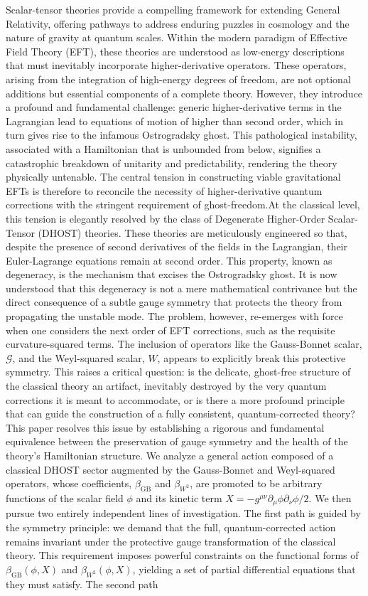 \documentclass[twocolumn]{aastex631}
\begin{document}
Scalar-tensor theories provide a compelling framework for extending General Relativity, offering pathways to address enduring puzzles in cosmology and the nature of gravity at quantum scales. Within the modern paradigm of Effective Field Theory (EFT), these theories are understood as low-energy descriptions that must inevitably incorporate higher-derivative operators. These operators, arising from the integration of high-energy degrees of freedom, are not optional additions but essential components of a complete theory. However, they introduce a profound and fundamental challenge: generic higher-derivative terms in the Lagrangian lead to equations of motion of higher than second order, which in turn gives rise to the infamous Ostrogradsky ghost. This pathological instability, associated with a Hamiltonian that is unbounded from below, signifies a catastrophic breakdown of unitarity and predictability, rendering the theory physically untenable. The central tension in constructing viable gravitational EFTs is therefore to reconcile the necessity of higher-derivative quantum corrections with the stringent requirement of ghost-freedom.At the classical level, this tension is elegantly resolved by the class of Degenerate Higher-Order Scalar-Tensor (DHOST) theories. These theories are meticulously engineered so that, despite the presence of second derivatives of the fields in the Lagrangian, their Euler-Lagrange equations remain at second order. This property, known as degeneracy, is the mechanism that excises the Ostrogradsky ghost. It is now understood that this degeneracy is not a mere mathematical contrivance but the direct consequence of a subtle gauge symmetry that protects the theory from propagating the unstable mode. The problem, however, re-emerges with force when one considers the next order of EFT corrections, such as the requisite curvature-squared terms. The inclusion of operators like the Gauss-Bonnet scalar, $\mathcal{G}$, and the Weyl-squared scalar, $W$, appears to explicitly break this protective symmetry. This raises a critical question: is the delicate, ghost-free structure of the classical theory an artifact, inevitably destroyed by the very quantum corrections it is meant to accommodate, or is there a more profound principle that can guide the construction of a fully consistent, quantum-corrected theory?This paper resolves this issue by establishing a rigorous and fundamental equivalence between the preservation of gauge symmetry and the health of the theory's Hamiltonian structure. We analyze a general action composed of a classical DHOST sector augmented by the Gauss-Bonnet and Weyl-squared operators, whose coefficients, $\beta_{\text{GB}}$ and $\beta_{W^2}$, are promoted to be arbitrary functions of the scalar field $\phi$ and its kinetic term $X = -g^{\mu\nu}\partial_\mu\phi\partial_\nu\phi/2$. We then pursue two entirely independent lines of investigation. The first path is guided by the symmetry principle: we demand that the full, quantum-corrected action remains invariant under the protective gauge transformation of the classical theory. This requirement imposes powerful constraints on the functional forms of $\beta_{\text{GB}}(\phi, X)$ and $\beta_{W^2}(\phi, X)$, yielding a set of partial differential equations that they must satisfy. The second path 
\end{document}

